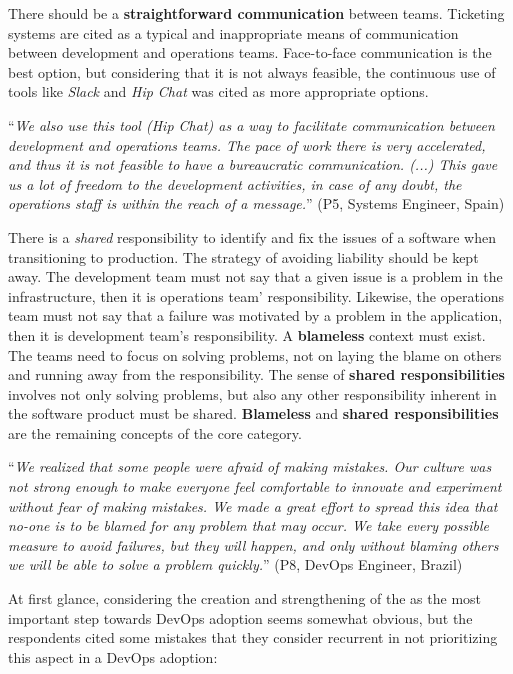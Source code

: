 There should be a \textbf{straightforward communication} between teams. Ticketing
systems are cited as a typical and inappropriate means of communication
between development and operations teams. Face-to-face communication is the best
option, but considering that it is not always feasible, the continuous use of
tools like \emph{Slack} and \emph{Hip Chat} was cited as more appropriate options.

\begin{mq}
``\emph{We also use this tool (Hip Chat) as a way to facilitate communication between
development and operations teams. The pace of work there is very accelerated, and thus
it is not feasible to have a bureaucratic communication. (...) This gave us a lot of
freedom to the development activities, in case of any doubt, the operations staff
is within the reach of a message.}'' (P5, Systems Engineer, Spain)
\end{mq}

There is a \emph{shared} responsibility to identify and fix the issues
of a software when transitioning to production. The strategy of avoiding liability should be kept away.
The development team must not say that a given issue is a problem in the infrastructure, then
it is operations team' responsibility. Likewise, the operations team
must not say that a failure was motivated by a problem in the application, then it is
development team's responsibility. A \textbf{blameless} context must exist.
The teams need to focus on solving problems, not on laying the blame on others
and running away from the responsibility. The sense of \textbf{shared
responsibilities} involves not only solving problems, but also any other
responsibility inherent in the software product must be shared.
\textbf{Blameless} and \textbf{shared responsibilities} are the remaining
concepts of the core category.

\begin{mq}
``\emph{We realized that some people were afraid of making mistakes. Our
culture was not strong enough to make everyone feel comfortable to innovate and
experiment without fear of making mistakes. We made a great effort to spread
this idea that no-one is to be blamed for any problem that may occur. We take
every possible measure to avoid failures, but they will happen, and only without
blaming others we will be able to solve a problem quickly.}'' (P8, DevOps Engineer, Brazil)
\end{mq}

At first glance, considering the creation and strengthening of the \cc as the
most important step towards DevOps adoption seems somewhat obvious, but
the respondents cited some mistakes that they consider recurrent in not
prioritizing this aspect in a DevOps adoption:

